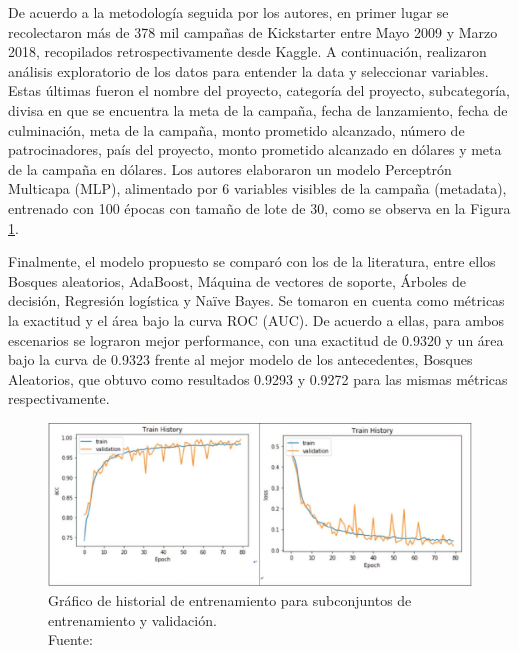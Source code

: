 De acuerdo a la metodología seguida por los autores, en primer lugar se recolectaron más de 378 mil campañas de Kickstarter entre Mayo 2009 y Marzo 2018, recopilados retrospectivamente desde Kaggle. A continuación, realizaron análisis exploratorio de los datos para entender la data y seleccionar variables. Estas últimas fueron el nombre del proyecto, categoría del proyecto, subcategoría, divisa en que se encuentra la meta de la campaña, fecha de lanzamiento, fecha de culminación, meta de la campaña, monto prometido alcanzado, número de patrocinadores, país del proyecto, monto prometido alcanzado en dólares y meta de la campaña en dólares. Los autores elaboraron un modelo Perceptrón Multicapa (MLP), alimentado por 6 variables visibles de la campaña (metadata), entrenado con 100 épocas con tamaño de lote de 30, como se observa en la Figura \ref{2:fig122}.

Finalmente, el modelo propuesto se comparó con los de la literatura, entre ellos Bosques aleatorios, AdaBoost, Máquina de vectores de soporte, Árboles de decisión, Regresión logística y Naïve Bayes.
Se tomaron en cuenta como métricas la exactitud y el área bajo la curva ROC (AUC). De acuerdo a ellas, para ambos escenarios se lograron mejor performance, con una exactitud de 0.9320 y un área bajo la curva de 0.9323 frente al mejor modelo de los antecedentes, Bosques Aleatorios, que obtuvo como resultados 0.9293 y 0.9272 para las mismas métricas respectivamente.

\begin{figure}[!ht]
	\begin{center}
		\includegraphics[width=1\textwidth]{2/figures/yu2018.jpg}
		\caption[Gráfico de historial de entrenamiento para subconjuntos de entrenamiento y validación]{Gráfico de historial de entrenamiento para subconjuntos de entrenamiento y validación.\\
			Fuente: \cite{pr_yu2018deeplearning}}
		\label{2:fig122}
	\end{center}
\end{figure}

